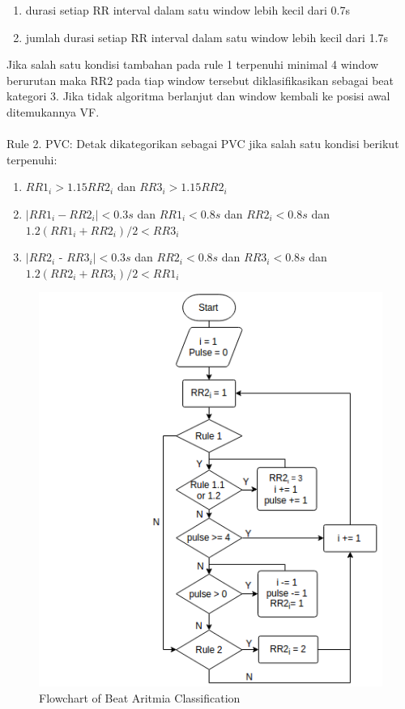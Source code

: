 \documentclass[]{indojc_single}
\begin{document}
\begin{enumerate}
	\item durasi setiap RR interval dalam satu window lebih kecil dari 0.7s
	\item jumlah durasi setiap RR interval dalam satu window lebih kecil dari 1.7s
\end{enumerate}

Jika salah satu kondisi tambahan pada rule 1 terpenuhi minimal 4 window berurutan maka RR2 pada tiap window tersebut diklasifikasikan sebagai beat kategori 3. Jika tidak algoritma berlanjut dan window kembali ke posisi awal ditemukannya VF.
\\
\\
Rule 2. PVC: Detak dikategorikan sebagai PVC jika salah satu kondisi berikut terpenuhi:

\begin{enumerate}
	\item $RR1_i > 1.15RR2_i$ dan $RR3_i > 1.15RR2_i$
	\item $|RR1_i - RR2_i| < 0.3s$ dan $RR1_i < 0.8s$ dan $RR2_i < 0.8s$ dan $1.2(RR1_i + RR2_i)/2 < RR3_i$
	\item $|RR2_i$ - $RR3_i| < 0.3s$ dan $RR2_i < 0.8s$ dan $RR3_i < 0.8s$ dan $1.2(RR2_i + RR3_i)/2 < RR1_i$
\end{enumerate}

\begin{figure}[htbp]
\centerline{\includegraphics[scale=0.55]{images/flowchart_aritmia.png}}
\caption{Flowchart of Beat Aritmia Classification}
\label{fig:flowchart_aritmia}
\end{figure}
\end{document}
